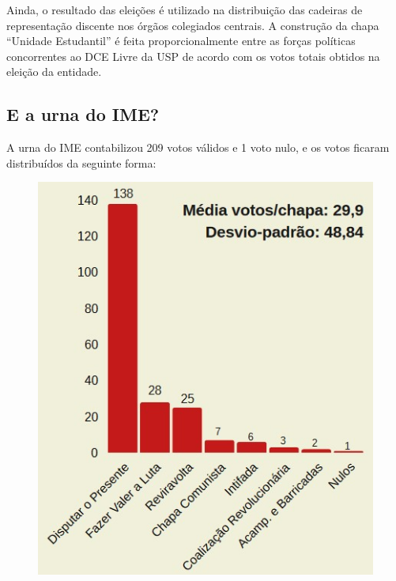 Ainda, o resultado das eleições é utilizado na distribuição das cadeiras de representação discente nos órgãos colegiados centrais. A construção da chapa “Unidade Estudantil” é feita proporcionalmente entre as forças políticas concorrentes ao DCE Livre da USP de acordo com os votos totais obtidos na eleição da entidade. 


\subsection*{E a urna do IME?}

A urna do IME contabilizou 209 votos válidos e 1 voto nulo, e os votos ficaram distribuídos da seguinte forma: 

\begin{figure}[H]
    \centering
    \includegraphics[width=0.88\columnwidth]{textos//img/resultado_ime.jpg}
\end{figure}


